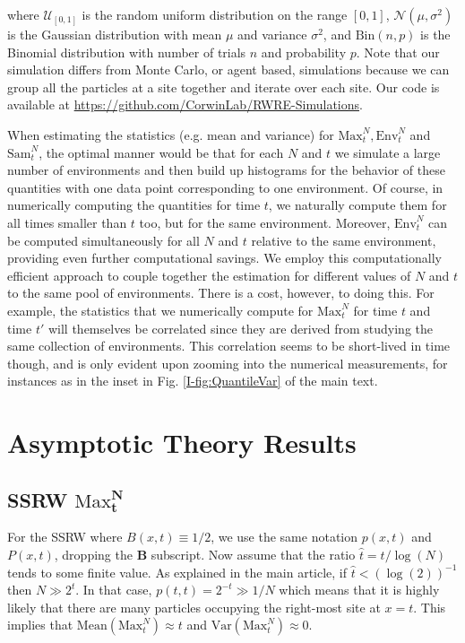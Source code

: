 \documentclass[letter,reqno, 11pt, oneside]{amsart}
\newcommand{\envnt}{\text{Env}_t^N}
\def\maxnt{\mathrm{Max}^{N}_t}
\def\snt{\mathrm{Sam}^{N}_t}
\newcommand{\mean}[1]{\mathrm{Mean}\left(#1\right)}
\newcommand{\var}[1]{\mathrm{Var}\left(#1\right)}
\begin{document}
where $\mathcal{U}_{[0, 1]}$ is the random uniform distribution on the range $[0, 1]$, $\mathcal{N}(\mu, \sigma^2)$ is the Gaussian distribution with mean $\mu$ and variance $\sigma^2$, and $\mathrm{Bin}(n, p)$ is the Binomial distribution with number of trials $n$ and probability $p$. Note that our simulation differs from Monte Carlo, or agent based, simulations because we can group all the particles at a site together and iterate over each site. Our code is available at \url{https://github.com/CorwinLab/RWRE-Simulations}.

When estimating the statistics (e.g. mean and variance) for $\maxnt,\envnt$ and $\snt$, the optimal manner would be that for each $N$ and $t$ we simulate a large number of environments and then build up histograms for the behavior of these quantities with one data point corresponding to one environment. Of course, in numerically computing the quantities for time $t$, we naturally compute them for all times smaller than $t$ too, but for the same environment. Moreover, $\envnt$ can be computed simultaneously for all $N$ and $t$ relative to the same environment, providing even further computational savings. We employ this computationally efficient approach to couple together the estimation for different values of $N$ and $t$ to the same pool of environments. There is a cost, however, to doing this. For example, the statistics that we numerically compute for $\maxnt$ for time $t$ and time $t'$ will themselves be correlated since they are derived from studying the same collection of environments. This correlation seems to be short-lived in time though, and is only evident upon zooming into the numerical measurements, for instances as in the inset in Fig. \ref{I-fig:QuantileVar} of the main text.

\section{Asymptotic Theory Results}
\subsection{SSRW $\boldsymbol{\maxnt}$}\label{sec:SSRW}For the SSRW where $B(x,t)\equiv 1/2$, we use the same notation $p(x,t)$ and $P(x,t)$, dropping the $\mathbf{B}$ subscript. Now assume that the ratio $\hat{t} = t/\log(N)$ tends to some finite value. As explained in the main article, if $\hat{t}<(\log(2))^{-1}$ then $N\gg 2^t$. In that case, $p(t,t)=2^{-t} \gg 1/N$ which means that it is highly likely that there are many particles occupying the right-most site at $x=t$. This implies that $\mean{\maxnt}\approx t$ and $\var{\maxnt}\approx 0$.
\end{document}
